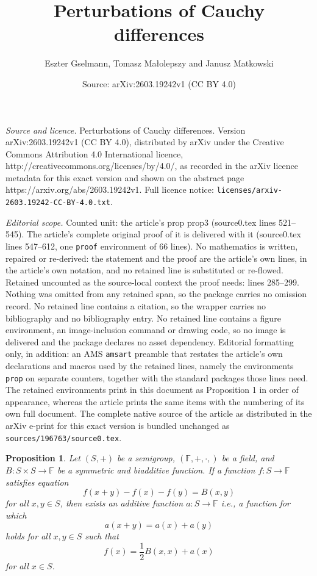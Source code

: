 \documentclass[10pt,a4paper]{amsart}
\title{Perturbations of Cauchy differences}
\author{Eszter Gselmann, Tomasz Małolepszy and Janusz Matkowski}
\date{Source: arXiv:2603.19242v1 (CC BY 4.0)}
\newtheorem{prop}{Proposition}
\begin{document}
\maketitle

\noindent\emph{Source and licence.} Perturbations of Cauchy differences. Version arXiv:2603.19242v1 (CC BY 4.0), distributed by arXiv under the Creative Commons Attribution 4.0 International licence, http://creativecommons.org/licenses/by/4.0/, as recorded in the arXiv licence metadata for this exact version and shown on the abstract page https://arxiv.org/abs/2603.19242v1. Full licence notice: \texttt{licenses/arxiv-2603.19242-CC-BY-4.0.txt}.\par\smallskip

\noindent\textit{Editorial scope.} Counted unit: the article's prop prop3 (source0.tex lines 521--545). The article's complete original proof of it is delivered with it (source0.tex lines 547--612, one \texttt{proof} environment of 66 lines). No mathematics is written, repaired or re-derived: the statement and the proof are the article's own lines, in the article's own notation, and no retained line is substituted or re-flowed.  Retained uncounted as the source-local context the proof needs: lines 285--299.  Nothing was omitted from any retained span, so the package carries no omission record.  No retained line contains a citation, so the wrapper carries no bibliography and no bibliography entry.  No retained line contains a figure environment, an image-inclusion command or drawing code, so no image is delivered and the package declares no asset dependency.  Editorial formatting only, in addition: an AMS \texttt{amsart} preamble that restates the article's own declarations and macros used by the retained lines, namely the environments \texttt{prop} on separate counters, together with the standard packages those lines need.  The retained environments print in this document as Proposition 1 in order of appearance, whereas the article prints the same items with the numbering of its own full document.  The complete native source of the article as distributed in the arXiv e-print for this exact version is bundled unchanged as \texttt{sources/196763/source0.tex}.
\begin{prop}\label{prop_biadditive}
 Let $(S, +)$ be a semigroup, $(\mathbb{F},+, \cdot, )$ be a field, and $B\colon S\times S\to \mathbb{F}$ be a symmetric and biadditive function. If a function $f\colon S\to \mathbb{F}$ satisfies equation 
 \begin{equation}\label{biadditive}
  f(x+y)-f(x)-f(y)= B(x, y)
 \end{equation}
for all $x, y\in S$, then exists an additive function $a\colon S\to \mathbb{F}$ i.e., a function for which 
\[
 a(x+y)= a(x)+a(y)
\]
holds for all $x, y\in S$ such that 
\[
 f(x)= \frac{1}{2}B(x, x)+a(x)
\]
for all $x\in S$. 
\end{prop}
\end{document}
